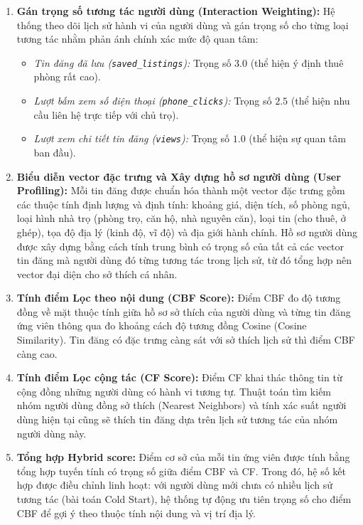 \begin{enumerate}
    \item \textbf{Gán trọng số tương tác người dùng (Interaction Weighting):} Hệ thống theo dõi lịch sử hành vi của người dùng và gán trọng số cho từng loại tương tác nhằm phản ánh chính xác mức độ quan tâm:
    \begin{itemize}
        \item \textit{Tin đăng đã lưu (\texttt{saved\_listings}):} Trọng số $3.0$ (thể hiện ý định thuê phòng rất cao).
        \item \textit{Lượt bấm xem số điện thoại (\texttt{phone\_clicks}):} Trọng số $2.5$ (thể hiện nhu cầu liên hệ trực tiếp với chủ trọ).
        \item \textit{Lượt xem chi tiết tin đăng (\texttt{views}):} Trọng số $1.0$ (thể hiện sự quan tâm ban đầu).
    \end{itemize}

    \item \textbf{Biểu diễn vector đặc trưng và Xây dựng hồ sơ người dùng (User Profiling):} 
    Mỗi tin đăng được chuẩn hóa thành một vector đặc trưng gồm các thuộc tính định lượng và định tính: khoảng giá, diện tích, số phòng ngủ, loại hình nhà trọ (phòng trọ, căn hộ, nhà nguyên căn), loại tin (cho thuê, ở ghép), tọa độ địa lý (kinh độ, vĩ độ) và địa giới hành chính.
    Hồ sơ người dùng được xây dựng bằng cách tính trung bình có trọng số của tất cả các vector tin đăng mà người dùng đó từng tương tác trong lịch sử, từ đó tổng hợp nên vector đại diện cho sở thích cá nhân.

    \item \textbf{Tính điểm Lọc theo nội dung (CBF Score):} Điểm CBF đo độ tương đồng về mặt thuộc tính giữa hồ sơ sở thích của người dùng và từng tin đăng ứng viên thông qua đo khoảng cách độ tương đồng Cosine (Cosine Similarity). Tin đăng có đặc trưng càng sát với sở thích lịch sử thì điểm CBF càng cao.

    \item \textbf{Tính điểm Lọc cộng tác (CF Score):} Điểm CF khai thác thông tin từ cộng đồng những người dùng có hành vi tương tự. Thuật toán tìm kiếm nhóm người dùng đồng sở thích (Nearest Neighbors) và tính xác suất người dùng hiện tại cũng sẽ thích tin đăng dựa trên lịch sử tương tác của nhóm người dùng này.

    \item \textbf{Tổng hợp Hybrid score:} Điểm cơ sở của mỗi tin ứng viên được tính bằng tổng hợp tuyến tính có trọng số giữa điểm CBF và CF. Trong đó, hệ số kết hợp được điều chỉnh linh hoạt: với người dùng mới chưa có nhiều lịch sử tương tác (bài toán Cold Start), hệ thống tự động ưu tiên trọng số cho điểm CBF để gợi ý theo thuộc tính nội dung và vị trí địa lý.


\end{enumerate}
